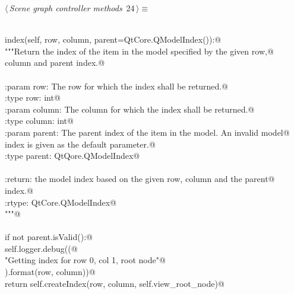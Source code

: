 \documentclass[
    a4paper,      %
    10pt,         %
    openright,    %
    notitlepage,  %
    parskip=half, %
]{scrreprt}       %
\theoremstyle{definition}                    %
\begin{document}
\begin{flushleft} \small
\begin{minipage}{\linewidth}\label{scrap22}\raggedright\small
{} $\langle\,${\itshape Scene graph controller methods}\nobreak\ {\footnotesize {24}}$\,\rangle\equiv$
\vspace{-1exm}
\begin{list}{}{} \item
\mbox{}\lstinline@@\\
\mbox{}\lstinline@def index(self, row, column, parent=QtCore.QModelIndex()):@\\
\mbox{}\lstinline@    """Return the index of the item in the model specified by the given row,@\\
\mbox{}\lstinline@    column and parent index.@\\
\mbox{}\lstinline@@\\
\mbox{}\lstinline@    :param row: The row for which the index shall be returned.@\\
\mbox{}\lstinline@    :type  row: int@\\
\mbox{}\lstinline@    :param column: The column for which the index shall be returned.@\\
\mbox{}\lstinline@    :type column: int@\\
\mbox{}\lstinline@    :param parent: The parent index of the item in the model. An invalid model@\\
\mbox{}\lstinline@                   index is given as the default parameter.@\\
\mbox{}\lstinline@    :type parent: QtQore.QModelIndex@\\
\mbox{}\lstinline@@\\
\mbox{}\lstinline@    :return: the model index based on the given row, column and the parent@\\
\mbox{}\lstinline@             index.@\\
\mbox{}\lstinline@    :rtype: QtCore.QModelIndex@\\
\mbox{}\lstinline@    """@\\
\mbox{}\lstinline@@\\
\mbox{}\lstinline@    if not parent.isValid():@\\
\mbox{}\lstinline@        self.logger.debug((@\\
\mbox{}\lstinline@            "Getting index for row {0}, col {1}, root node"@\\
\mbox{}\lstinline@        ).format(row, column))@\\
\mbox{}\lstinline@        return self.createIndex(row, column, self.view_root_node)@\\

\end{list}
\end{minipage}
\end{flushleft}
\end{document}
